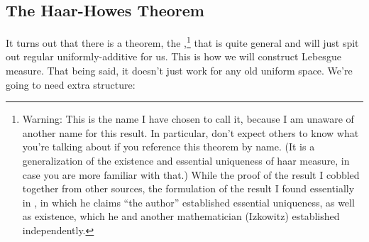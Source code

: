 \subsection{The Haar-Howes Theorem}

It turns out that there is a theorem, the ,\footnote{Warning:  This is the name I have chosen to call it, because I am unaware of another name for this result.  In particular, don't expect others to know what you're talking about if you reference this theorem by name.  (It is a generalization of the existence and essential uniqueness of haar measure, in case you are more familiar with that.)  While the proof of the result I cobbled together from other sources, the formulation of the result I found essentially in \cite{Howes}, in which he claims ``the author'' established essential uniqueness, as well as existence, which he and another mathematician (Izkowitz) established independently.}  that is quite general and will just spit out regular uniformly-additive for us.  This is how we will construct Lebesgue measure.  That being said, it doesn't just work for any old uniform space.  We're going to need extra structure:

